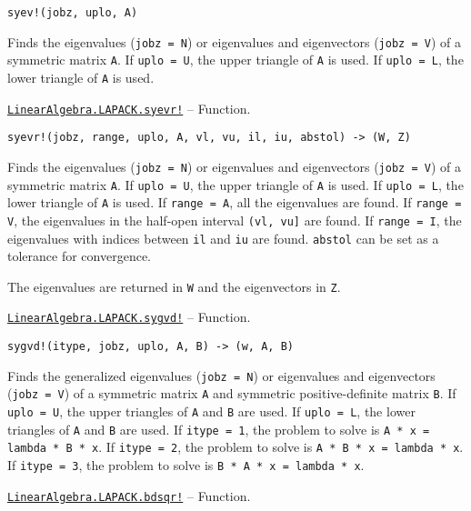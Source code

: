 \begin{adjustwidth}{2em}{0pt}


\begin{verbatim}
syev!(jobz, uplo, A)
\end{verbatim}

Finds the eigenvalues (\texttt{jobz = N}) or eigenvalues and eigenvectors (\texttt{jobz = V}) of a symmetric matrix \texttt{A}. If \texttt{uplo = U}, the upper triangle of \texttt{A} is used. If \texttt{uplo = L}, the lower triangle of \texttt{A} is used.



\end{adjustwidth}
\hypertarget{9325824410810690137}{}
\hyperlink{9325824410810690137}{\texttt{LinearAlgebra.LAPACK.syevr!}}  -- {Function.}

\begin{adjustwidth}{2em}{0pt}


\begin{verbatim}
syevr!(jobz, range, uplo, A, vl, vu, il, iu, abstol) -> (W, Z)
\end{verbatim}

Finds the eigenvalues (\texttt{jobz = N}) or eigenvalues and eigenvectors (\texttt{jobz = V}) of a symmetric matrix \texttt{A}. If \texttt{uplo = U}, the upper triangle of \texttt{A} is used. If \texttt{uplo = L}, the lower triangle of \texttt{A} is used. If \texttt{range = A}, all the eigenvalues are found. If \texttt{range = V}, the eigenvalues in the half-open interval \texttt{(vl, vu]} are found. If \texttt{range = I}, the eigenvalues with indices between \texttt{il} and \texttt{iu} are found. \texttt{abstol} can be set as a tolerance for convergence.

The eigenvalues are returned in \texttt{W} and the eigenvectors in \texttt{Z}.



\end{adjustwidth}
\hypertarget{8632196472915375761}{}
\hyperlink{8632196472915375761}{\texttt{LinearAlgebra.LAPACK.sygvd!}}  -- {Function.}

\begin{adjustwidth}{2em}{0pt}


\begin{verbatim}
sygvd!(itype, jobz, uplo, A, B) -> (w, A, B)
\end{verbatim}

Finds the generalized eigenvalues (\texttt{jobz = N}) or eigenvalues and eigenvectors (\texttt{jobz = V}) of a symmetric matrix \texttt{A} and symmetric positive-definite matrix \texttt{B}. If \texttt{uplo = U}, the upper triangles of \texttt{A} and \texttt{B} are used. If \texttt{uplo = L}, the lower triangles of \texttt{A} and \texttt{B} are used. If \texttt{itype = 1}, the problem to solve is \texttt{A * x = lambda * B * x}. If \texttt{itype = 2}, the problem to solve is \texttt{A * B * x = lambda * x}. If \texttt{itype = 3}, the problem to solve is \texttt{B * A * x = lambda * x}.



\end{adjustwidth}
\hypertarget{13657736097940764011}{}
\hyperlink{13657736097940764011}{\texttt{LinearAlgebra.LAPACK.bdsqr!}}  -- {Function.}


